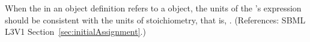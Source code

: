 When the  in an \InitialAssignment object definition refers
to a \SpeciesReference object, the units of the \InitialAssignment's
 expression should be consistent with the units of
stoichiometry, that is, .  (References: SBML L3V1
Section~\ref{sec:initialAssignment}.)
